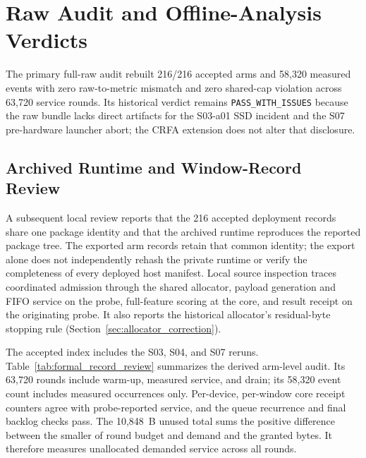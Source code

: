 \documentclass[10pt,onecolumn]{IEEEtran}
\begin{document}
\section{Raw Audit and Offline-Analysis Verdicts}
The primary full-raw audit rebuilt 216/216 accepted arms and 58,320 measured
events with zero raw-to-metric mismatch and zero shared-cap violation across
63,720 service rounds. Its historical verdict remains
\texttt{PASS\_WITH\_ISSUES} because the raw bundle lacks direct artifacts
for the S03-a01 SSD incident and the S07 pre-hardware launcher abort; the
CRFA extension does not alter that disclosure.

\subsection{Archived Runtime and Window-Record Review}
\label{sec:formal_record_review}
A subsequent local review reports that the 216 accepted deployment records
share one package identity and that the archived runtime reproduces the
reported package tree. The exported arm records retain that common identity;
the export alone does not independently rehash the private runtime or verify
the completeness of every deployed host manifest. Local source inspection
traces coordinated admission through the shared allocator, payload generation
and FIFO service on the probe, full-feature scoring at the core, and result
receipt on the originating probe. It also reports the historical allocator's
residual-byte stopping rule (Section~\ref{sec:allocator_correction}).

The accepted index includes the S03, S04, and S07 reruns.
Table~\ref{tab:formal_record_review} summarizes the derived arm-level audit.
Its 63,720 rounds include warm-up, measured service, and drain; its 58,320
event count includes measured occurrences only. Per-device, per-window core
receipt counters agree with probe-reported service, and the queue recurrence
and final backlog checks pass. The 10,848~B unused total sums the positive
difference between the smaller of round budget and demand and the granted
bytes. It therefore measures unallocated demanded service across all rounds.
\end{document}
